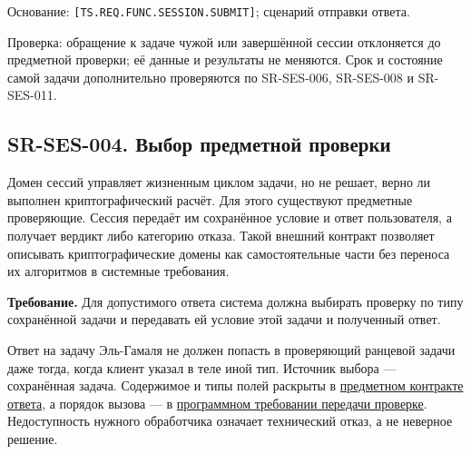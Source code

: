 \documentclass[12pt,a4paper]{article}
\begin{document}
Основание: \texttt{[TS.\allowbreak{}REQ.\allowbreak{}FUNC.\allowbreak{}SESSION.\allowbreak{}SUBMIT]}; сценарий отправки ответа.

Проверка: обращение к задаче чужой или завершённой сессии отклоняется до предметной проверки; её данные и результаты не меняются. Срок и состояние самой задачи дополнительно проверяются по SR-SES-006, SR-SES-008 и SR-SES-011.

\subsection{SR-SES-004. Выбор предметной проверки}\label{sr-ses-004-ux432ux44bux431ux43eux440-ux43fux440ux435ux434ux43cux435ux442ux43dux43eux439-ux43fux440ux43eux432ux435ux440ux43aux438}

\hypertarget{sr-ses-004-выбор-предметной-проверки}{}

Домен сессий управляет жизненным циклом задачи, но не решает, верно ли выполнен криптографический расчёт. Для этого существуют предметные проверяющие. Сессия передаёт им сохранённое условие и ответ пользователя, а получает вердикт либо категорию отказа. Такой внешний контракт позволяет описывать криптографические домены как самостоятельные части без переноса их алгоритмов в системные требования.

\textbf{Требование.} Для допустимого ответа система должна выбирать проверку по типу сохранённой задачи и передавать ей условие этой задачи и полученный ответ.

Ответ на задачу Эль-Гамаля не должен попасть в проверяющий ранцевой задачи даже тогда, когда клиент указал в теле иной тип. Источник выбора --- сохранённая задача. Содержимое и типы полей раскрыты в \href{../07_\%D0\%9F\%D1\%80\%D0\%BE\%D0\%B3\%D1\%80\%D0\%B0\%D0\%BC\%D0\%BC\%D0\%BD\%D1\%8B\%D0\%B5_\%D1\%82\%D1\%80\%D0\%B5\%D0\%B1\%D0\%BE\%D0\%B2\%D0\%B0\%D0\%BD\%D0\%B8\%D1\%8F/DOC-06.2_\%D0\%A1\%D0\%B5\%D1\%81\%D1\%81\%D0\%B8\%D0\%B8_\%D0\%B7\%D0\%B0\%D0\%B4\%D0\%B0\%D1\%87_\%D0\%B8_\%D0\%BF\%D0\%BB\%D0\%B0\%D0\%BD\%D0\%B8\%D1\%80\%D0\%BE\%D0\%B2\%D1\%89\%D0\%B8\%D0\%BA.pdf\#nameddest=\%D0\%BF\%D1\%80\%D0\%B5\%D0\%B4\%D0\%BC\%D0\%B5\%D1\%82\%D0\%BD\%D1\%8B\%D0\%B9-\%D0\%BE\%D1\%82\%D0\%B2\%D0\%B5\%D1\%82}{предметном контракте ответа}, а порядок вызова --- в \href{../07_\%D0\%9F\%D1\%80\%D0\%BE\%D0\%B3\%D1\%80\%D0\%B0\%D0\%BC\%D0\%BC\%D0\%BD\%D1\%8B\%D0\%B5_\%D1\%82\%D1\%80\%D0\%B5\%D0\%B1\%D0\%BE\%D0\%B2\%D0\%B0\%D0\%BD\%D0\%B8\%D1\%8F/DOC-06.2_\%D0\%A1\%D0\%B5\%D1\%81\%D1\%81\%D0\%B8\%D0\%B8_\%D0\%B7\%D0\%B0\%D0\%B4\%D0\%B0\%D1\%87_\%D0\%B8_\%D0\%BF\%D0\%BB\%D0\%B0\%D0\%BD\%D0\%B8\%D1\%80\%D0\%BE\%D0\%B2\%D1\%89\%D0\%B8\%D0\%BA.pdf\#nameddest=swr-ses-010-\%D0\%BF\%D0\%B5\%D1\%80\%D0\%B5\%D0\%B4\%D0\%B0\%D1\%87\%D0\%B0-\%D0\%BF\%D1\%80\%D0\%BE\%D1\%84\%D0\%B8\%D0\%BB\%D1\%8C\%D0\%BD\%D0\%BE\%D0\%B9-\%D0\%BF\%D1\%80\%D0\%BE\%D0\%B2\%D0\%B5\%D1\%80\%D0\%BA\%D0\%B5}{программном требовании передачи проверке}. Недоступность нужного обработчика означает технический отказ, а не неверное решение.
\end{document}
